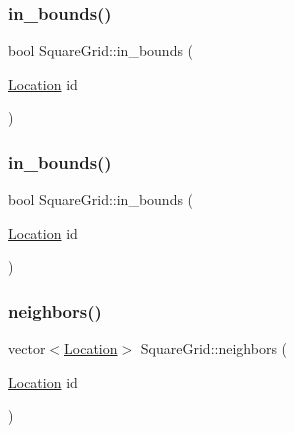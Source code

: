 \subsubsection{\texorpdfstring{in\+\_\+bounds()}{in\_bounds()}\hspace{0.1cm}{\footnotesize\ttfamily [1/2]}}
{\footnotesize\ttfamily bool Square\+Grid\+::in\+\_\+bounds (\begin{DoxyParamCaption}\item[{\mbox{\hyperlink{structSquareGrid_a2c9a2cbd3912aa48ac97289abc3f1c0f}{Location}}}]{id }\end{DoxyParamCaption})\hspace{0.3cm}{\ttfamily [inline]}}

\mbox{\label{structSquareGrid_a84bbaa9dad618228a2d6d3196254b86b}} 
\subsubsection{\texorpdfstring{in\+\_\+bounds()}{in\_bounds()}\hspace{0.1cm}{\footnotesize\ttfamily [2/2]}}
{\footnotesize\ttfamily bool Square\+Grid\+::in\+\_\+bounds (\begin{DoxyParamCaption}\item[{\mbox{\hyperlink{structSquareGrid_a2c9a2cbd3912aa48ac97289abc3f1c0f}{Location}}}]{id }\end{DoxyParamCaption})\hspace{0.3cm}{\ttfamily [inline]}}

\mbox{\label{structSquareGrid_a106d76702d8c4acb03883c477db28e3a}} 
\subsubsection{\texorpdfstring{neighbors()}{neighbors()}\hspace{0.1cm}{\footnotesize\ttfamily [1/2]}}
{\footnotesize\ttfamily vector$<$\mbox{\hyperlink{structSquareGrid_a2c9a2cbd3912aa48ac97289abc3f1c0f}{Location}}$>$ Square\+Grid\+::neighbors (\begin{DoxyParamCaption}\item[{\mbox{\hyperlink{structSquareGrid_a2c9a2cbd3912aa48ac97289abc3f1c0f}{Location}}}]{id }\end{DoxyParamCaption})\hspace{0.3cm}{\ttfamily [inline]}}

